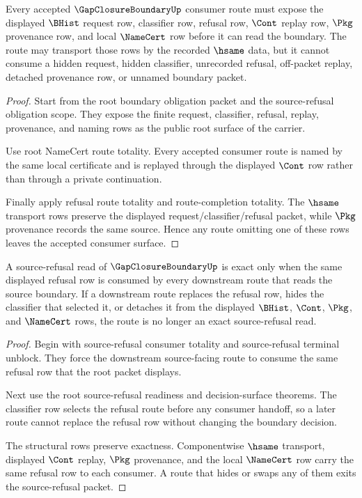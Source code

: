 \begin{theorem}
\label{thm:gap-closure-boundary-consumer-obligation-closure}
Every accepted $\GapClosureBoundaryUp$ consumer route must expose the displayed $\BHist$ request row, classifier row, refusal row, $\Cont$ replay row, $\Pkg$ provenance row, and local $\NameCert$ row before it can read the boundary. The route may transport those rows by the recorded $\hsame$ data, but it cannot consume a hidden request, hidden classifier, unrecorded refusal, off-packet replay, detached provenance row, or unnamed boundary packet.
\end{theorem}
\begin{proof}
Start from the root boundary obligation packet and the source-refusal obligation scope. They expose the finite request, classifier, refusal, replay, provenance, and naming rows as the public root surface of the carrier.

Use root NameCert route totality. Every accepted consumer route is named by the same local certificate and is replayed through the displayed $\Cont$ row rather than through a private continuation.

Finally apply refusal route totality and route-completion totality. The $\hsame$ transport rows preserve the displayed request/classifier/refusal packet, while $\Pkg$ provenance records the same source. Hence any route omitting one of these rows leaves the accepted consumer surface.
\end{proof}

\begin{theorem}
\label{thm:gap-closure-boundary-source-refusal-exactness}
A source-refusal read of $\GapClosureBoundaryUp$ is exact only when the same displayed refusal row is consumed by every downstream route that reads the source boundary. If a downstream route replaces the refusal row, hides the classifier that selected it, or detaches it from the displayed $\BHist$, $\Cont$, $\Pkg$, and $\NameCert$ rows, the route is no longer an exact source-refusal read.
\end{theorem}
\begin{proof}
Begin with source-refusal consumer totality and source-refusal terminal unblock. They force the downstream source-facing route to consume the same refusal row that the root packet displays.

Next use the root source-refusal readiness and decision-surface theorems. The classifier row selects the refusal route before any consumer handoff, so a later route cannot replace the refusal row without changing the boundary decision.

The structural rows preserve exactness. Componentwise $\hsame$ transport, displayed $\Cont$ replay, $\Pkg$ provenance, and the local $\NameCert$ row carry the same refusal row to each consumer. A route that hides or swaps any of them exits the source-refusal packet.
\end{proof}

